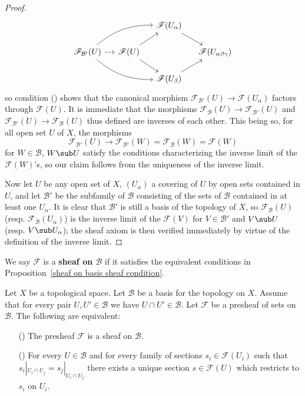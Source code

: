 \begin{proof}
\[\begin{tikzcd}[row sep=15pt,column sep=12pt]
&&\mathscr{F}(U_\alpha)\ar[rd]\\
\mathscr{F}_{\mathcal{B}'}(U)\ar[rru,bend left=20pt]\ar[rrd,bend right=20pt]\ar[r,dashed]&\mathscr{F}(U)\ar[rd]\ar[ru]&&\mathscr{F}(U_{\alpha\beta\gamma})\\
&&\mathscr{F}(U_\beta)\ar[ru]
\end{tikzcd}\]
so condition () shows that the canonical morphism $\mathscr{F}_{\mathcal{B}'}(U)\to\mathscr{F}(U_\alpha)$ factors through $\mathscr{F}(U)$. It is immediate that the morphisms $\mathscr{F}_{\mathcal{B}}(U)\to\mathscr{F}_{\mathcal{B}'}(U)$ and $\mathscr{F}_{\mathcal{B}'}(U)\to\mathscr{F}_{\mathcal{B}}(U)$ thus defined are inverses of each other. This being so, for all open set $U$ of $X$, the morphisms
\[\mathscr{F}_{\mathcal{B}'}(U)\to\mathscr{F}_{\mathcal{B}'}(W)=\mathscr{F}_{\mathcal{B}}(W)=\mathscr{F}(W)\]
for $W\in\mathcal{B}$, $W\sub U$ satisfy the conditions characterizing the inverse limit of the $\mathscr{F}(W)$'s, so our claim follows from the uniqueness of the inverse limit.\par
Now let $U$ be any open set of $X$, $(U_\alpha)$ a covering of $U$ by open sets contained in $U$, and let $\mathcal{B}'$ be the subfamily of $\mathcal{B}$ consisting of the sets of $\mathcal{B}$ contained in at least one $U_\alpha$. It is clear that $\mathcal{B}'$ is still a basis of the topology of $X$, so $\mathscr{F}_{\mathcal{B}}(U)$ (resp. $\mathscr{F}_{\mathcal{B}}(U_\alpha)$) is the inverse limit of the $\mathscr{F}(V)$ for $V\in\mathcal{B}'$ and $V\sub U$ (resp. $V\sub U_\alpha$); the sheaf axiom is then verified immediately by virtue of the definition of the inverse limit.
\end{proof}
We say $\mathscr{F}$ is a \textbf{sheaf on $\mathcal{B}$} if it satisfies the equivalent conditions in Proposition~\ref{sheaf on basis sheaf condition}.
\begin{corollary}\label{sheaf basis cofinal coro}
Let $X$ be a topological space. Let $\mathcal{B}$ be a basis for the topology on $X$. Assume that for every pair $U,U'\in\mathcal{B}$ we have $U\cap U'\in\mathcal{B}$. Let $\mathscr{F}$ be a presheaf of sets on $\mathcal{B}$. The following are equivalent:
\begin{itemize}
\item[(\rmnum{1})] The presheaf $\mathscr{F}$ is a sheaf on $\mathcal{B}$.
\item[(\rmnum{2})] For every $U\in\mathcal{B}$ and for every family of sections $s_i\in\mathscr{F}(U_i)$ such that $s_{i}|_{U_i\cap U_j}=s_j|_{U_i\cap U_j}$ there exists a unique section $s\in\mathscr{F}(U)$ which restricts to $s_i$ on $U_i$.
\end{itemize}
\end{corollary}
